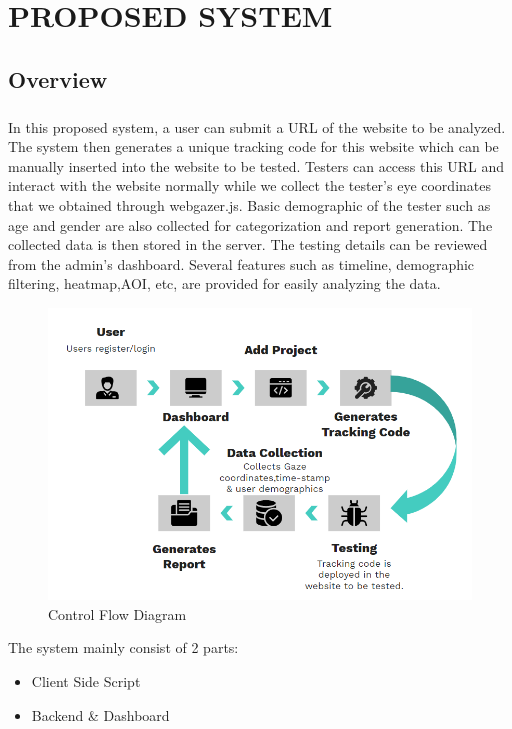 \documentclass[hidelinks,12pt,a4paper,final]{extreport}
\begin{document}
\newpage
\chapter{PROPOSED SYSTEM}
\section{Overview}
\paragraph{}
In this proposed system, a user can submit a URL of the website to be analyzed. The system then generates a unique tracking code for this website which can be manually inserted into the website to be tested.
Testers can access this URL and interact with the website normally while we collect the tester's eye coordinates that we obtained through webgazer.js. Basic demographic of the tester such as age and gender are also collected for categorization and report generation. The collected data is then stored in the server. 
The testing details can be reviewed from the admin's dashboard. Several features such as timeline, demographic filtering, heatmap,AOI, etc, are provided for easily analyzing the data.
\begin{figure}[H]
    \centering
    \includegraphics[width=\linewidth]{proposed-method.png}
    \caption{Control Flow Diagram}
\end{figure}
The system mainly consist of 2 parts:
\begin{itemize}
	\item Client Side Script
	\item Backend \& Dashboard
\end{itemize}
\end{document}
